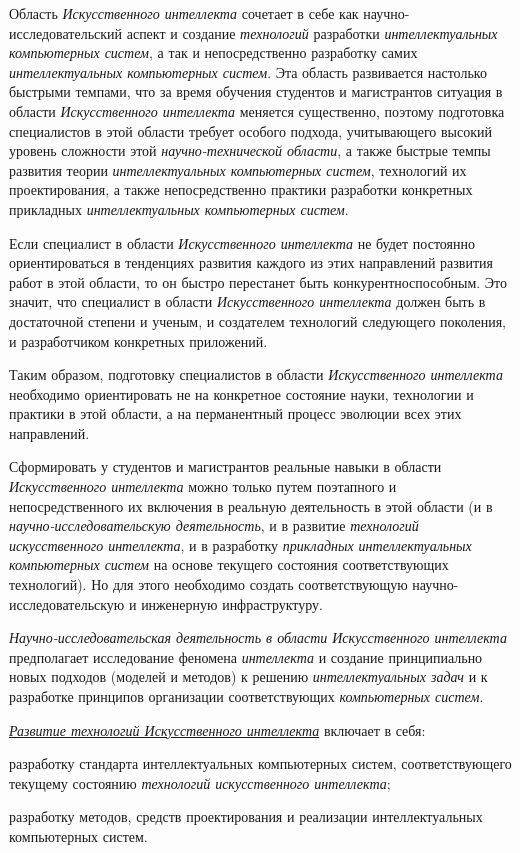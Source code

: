 \begin{SCn}
{	Область \textit{Искусственного интеллекта} сочетает в себе как  научно-исследовательский аспект и   создание \textit{технологий} разработки \textit{интеллектуальных компьютерных систем}, а так и непосредственно разработку самих \textit{интеллектуальных компьютерных систем}. Эта область развивается настолько быстрыми темпами, что за время обучения студентов и магистрантов ситуация в области \textit{Искусственного интеллекта} меняется существенно, поэтому подготовка специалистов в этой области требует особого подхода, учитывающего высокий уровень сложности этой \textit{научно-технической области}, а также быстрые темпы развития теории \textit{интеллектуальных компьютерных систем}, технологий их проектирования, а также непосредственно практики разработки конкретных прикладных \textit{интеллектуальных компьютерных систем}.
	
	Если специалист в области \textit{Искусственного интеллекта} не будет постоянно ориентироваться в тенденциях развития каждого из этих направлений развития работ в этой области, то он быстро перестанет быть конкурентноспособным. Это значит, что специалист в области \textit{Искусственного интеллекта} должен быть в достаточной степени и ученым, и создателем технологий следующего поколения, и разработчиком конкретных приложений.
	
	Таким образом, подготовку специалистов в области \textit{Искусственного интеллекта} необходимо ориентировать не на конкретное состояние науки, технологии и практики в этой области, а на перманентный процесс эволюции всех этих направлений.
	
	Сформировать у студентов и магистрантов реальные навыки в области \textit{Искусственного интеллекта} можно только путем поэтапного и непосредственного их включения в  реальную деятельность в этой области (и в \textit{научно-исследовательскую деятельность}, и в развитие \textit{технологий искусственного интеллекта}, и в разработку \textit{прикладных интеллектуальных компьютерных систем} на основе текущего состояния соответствующих технологий). Но для этого необходимо создать соответствующую научно-исследовательскую и инженерную инфраструктуру.
	
	\textit{Научно-исследовательская деятельность  в области Искусственного интеллекта} предполагает исследование феномена \textit{интеллекта} и создание принципиально новых подходов (моделей и методов) к решению \textit{интеллектуальных задач} и к разработке принципов организации соответствующих \textit{компьютерных систем}.
	
	\uline{\textit{Развитие технологий Искусственного интеллекта}} включает в себя:
	\begin{scnitemize}
		\item разработку стандарта интеллектуальных компьютерных систем, соответствующего текущему состоянию \textit{технологий искусственного интеллекта};
		\item разработку методов, средств проектирования и реализации интеллектуальных компьютерных систем.
	\end{scnitemize}
	
}
\end{SCn}

